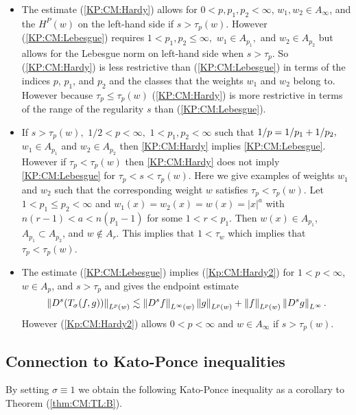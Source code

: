 \begin{itemize}
\item The estimate (\ref{KP:CM:Hardy}) allows for $0<p,p_1,p_2 < \infty$, $w_1,w_2 \in A_\infty$, and the $H^P(w)$ on the left-hand side if $s>\tau_p(w)$. However (\ref{KP:CM:Lebesgue}) requires $1<p_1,p_2\le \infty,$ $w_1\in A_{p_1},$ and $w_2\in A_{p_2}$ but allows for the Lebesgue norm on left-hand side when $s>\tau_p$. So (\ref{KP:CM:Hardy}) is less restrictive than (\ref{KP:CM:Lebesgue}) in terms of the indices $p$, $p_1$, and $p_2$ and the classes that the weights $w_1$ and $w_2$ belong to. However because $\tau_p \leq \tau_p(w)$ (\ref{KP:CM:Hardy}) is more restrictive in terms of the range of the regularity $s$ than (\ref{KP:CM:Lebesgue}).
\item If $s>\tau_{p}(w),$   $1/2<p<\infty,$ $1<p_1,p_2<\infty$ such that $1/p=1/p_1+1/p_2,$  $w_1\in A_{p_1}$ and $w_2\in A_{p_2}$ then \eqref{KP:CM:Hardy} implies \eqref{KP:CM:Lebesgue}. However if $\tau_p < \tau_p(w)$ then \eqref{KP:CM:Hardy} does not imply \eqref{KP:CM:Lebesgue} for $\tau_p < s < \tau_p(w)$. Here we give examples of weights $w_1$ and $w_2$ such that the corresponding weight $w$ satisfies $\tau_p < \tau_p(w)$.  Let $1<p_1\leq p_2 <\infty$ and $w_1(x) = w_2(x) = w(x) = |x|^a$ with $n(r-1)<a<n(p_1-1)$ for some $1<r<p_1$. Then $w(x) \in A_{p_1}$, $A_{p_1} \subset A_{p_2}$, and $w \notin A_r$. This implies that $1<\tau_w$ which implies that $\tau_p < \tau_p(w)$. 
\item  The estimate (\ref{KP:CM:Lebesgue}) implies (\ref{Kp:CM:Hardy2}) for $1<p<\infty$, $w\in A_p$, and $s>\tau_p$ and gives the endpoint estimate 
\[ \left\|D^s(T_\sigma(f,g))\right\|_{L^p(w)} \lesssim \left\|D^s f\right\|_{L^{\infty}(w)} \left\|g\right\|_{L^{p}(w)} +  \left\|f\right\|_{L^{p}(w)}\left\|D^s g\right\|_{L^\infty}. \]
However (\ref{Kp:CM:Hardy2}) allows $0<p<\infty$ and $w\in A_\infty$ if $s>\tau_p (w)$.
\end{itemize}

\subsection{Connection to Kato-Ponce inequalities}
By setting $\sigma \equiv 1$ we obtain the following Kato-Ponce inequality as a corollary to Theorem (\ref{thm:CM:TL:B}). 

